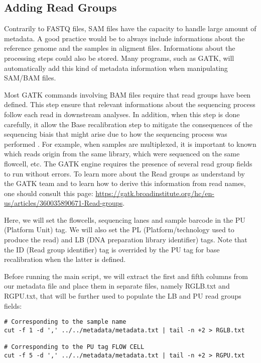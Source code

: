 \subsection{Adding Read Groups}

Contrarily to FASTQ files, SAM files have the capacity to handle large amount of metadata. A good practice would be to always include informations about the reference genome and the samples in aligment files. Informations about the processing steps could also be stored. Many programs, such as GATK, will automatically add this kind of metadata information when manipulating SAM/BAM files.


Most GATK commands involving BAM files require that read groups have been defined. This step ensure that relevant informations about the sequencing process follow each read in downstream analyses. In addition, when this step is done carefully, it allow the Base recalibration step to mitigate the consequences of the sequencing biais that might arise due to how the sequencing process was performed \cite{GATK_ReadGroups}. For example, when samples are multiplexed, it is important to known which reads origin from the same library, which were sequenced on the same flowcell, etc. The GATK engine requires the presence of several read group fields to run without errors. To learn more about the Read groups as understand by the GATK team and to learn how to derive this information from read names, one should consult this page: \href{https://gatk.broadinstitute.org/hc/en-us/articles/360035890671-Read-groups}{https://gatk.broadinstitute.org/hc/en-us/articles/360035890671-Read-groups}.

Here, we will set the flowcells, sequencing lanes and sample barcode in the PU (Platform Unit) tag. We will also set the PL (Platform/technology used to produce the read) and LB (DNA preparation library identifier) tags. Note that the ID (Read group identifier) tag is overrided by the PU tag for base recalibration when the latter is defined.

Before running the main script, we will extract the first and fifth columns from our metadata file and place them in separate files, namely RGLB.txt and  RGPU.txt, that will be further used to populate the LB and PU read groups fields:

\begin{verbatim}
# Corresponding to the sample name
cut -f 1 -d ',' ../../metadata/metadata.txt | tail -n +2 > RGLB.txt

# Corresponding to the PU tag FLOW CELL 
cut -f 5 -d ',' ../../metadata/metadata.txt | tail -n +2 > RGPU.txt
\end{verbatim}


